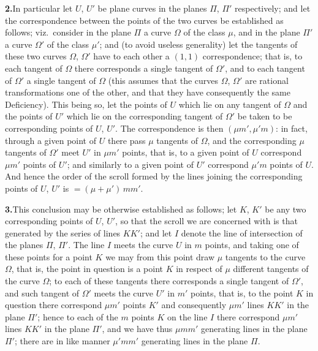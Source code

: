\documentclass[11pt,a4paper]{article}
\begin{document}
\textbf{2.}\quad In particular let $U$, $U'$ be plane curves in the planes
$\Pi$, $\Pi'$ respectively; and let the correspondence between the points of
the two curves be established as follows; viz.\ consider in the plane $\Pi$ a
curve $\Omega$ of the class $\mu$, and in the plane $\Pi'$ a curve $\Omega'$ of
the class $\mu'$; and (to avoid useless generality) let the tangents of these
two curves $\Omega$, $\Omega'$ have to each other a $(1,1)$ correspondence;
that is, to each tangent of $\Omega$ there corresponds a single tangent of
$\Omega'$, and to each tangent of $\Omega'$ a single tangent of $\Omega$ (this
assumes that the curves $\Omega$, $\Omega'$ are rational transformations one of
the other, and that they have consequently the same Deficiency). This being so,
let the points of $U$ which lie on any tangent of $\Omega$ and the points of
$U'$ which lie on the corresponding tangent of $\Omega'$ be taken to be
corresponding points of $U$, $U'$. The correspondence is then $(\mu m', \mu' m)$:
in fact, through a given point of $U$ there pass $\mu$ tangents of $\Omega$, and
the corresponding $\mu$ tangents of $\Omega'$ meet $U'$ in $\mu m'$ points, that
is, to a given point of $U$ correspond $\mu m'$ points of $U'$; and similarly
to a given point of $U'$ correspond $\mu' m$ points of $U$. And hence the order
of the scroll formed by the lines joining the corresponding points of $U$, $U'$
is $= (\mu + \mu')\,m m'$.

\textbf{3.}\quad This conclusion may be otherwise established as follows; let
$K$, $K'$ be any two corresponding points of $U$, $U'$, so that the scroll we
are concerned with is that generated by the series of lines $KK'$; and let $I$
denote the line of intersection of the planes $\Pi$, $\Pi'$. The line $I$ meets
the curve $U$ in $m$ points, and taking one of these points for a point $K$ we
may from this point draw $\mu$ tangents to the curve $\Omega$, that is, the
point in question is a point $K$ in respect of $\mu$ different tangents of the
curve $\Omega$; to each of these tangents there corresponds a single tangent of
$\Omega'$, and such tangent of $\Omega'$ meets the curve $U'$ in $m'$ points,
that is, to the point $K$ in question there correspond $\mu m'$ points $K'$ and
consequently $\mu m'$ lines $KK'$ in the plane $\Pi'$; hence to each of the $m$
points $K$ on the line $I$ there correspond $\mu m'$ lines $KK'$ in the plane
$\Pi'$, and we have thus $\mu m m'$ generating lines in the plane $\Pi'$; there
are in like manner $\mu' m m'$ generating lines in the plane $\Pi$.
\end{document}
